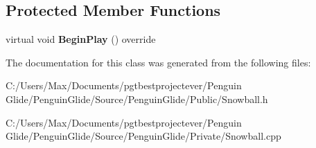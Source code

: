 \subsection*{Protected Member Functions}
\begin{DoxyCompactItemize}
\item 
\mbox{\label{class_a_snowball_a760c05ce68090af79cb18cf354c2476c}} 
virtual void {\bfseries Begin\+Play} () override
\end{DoxyCompactItemize}


The documentation for this class was generated from the following files\+:\begin{DoxyCompactItemize}
\item 
C\+:/\+Users/\+Max/\+Documents/pgtbestprojectever/\+Penguin Glide/\+Penguin\+Glide/\+Source/\+Penguin\+Glide/\+Public/Snowball.\+h\item 
C\+:/\+Users/\+Max/\+Documents/pgtbestprojectever/\+Penguin Glide/\+Penguin\+Glide/\+Source/\+Penguin\+Glide/\+Private/Snowball.\+cpp\end{DoxyCompactItemize}

